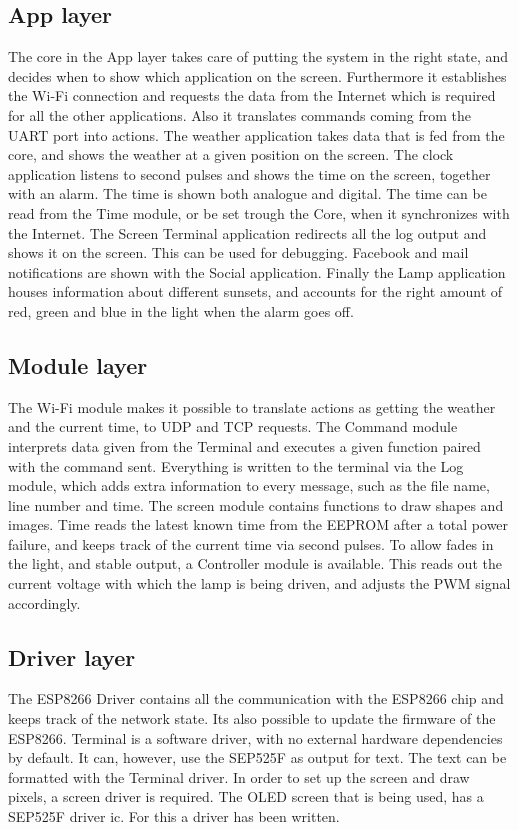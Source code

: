 \subsection{App layer} The core in the App layer takes care of putting the system in the right state, and decides when to show which application on the screen. Furthermore it establishes the Wi-Fi connection and requests the data from the Internet which is required for all the other applications. Also it translates commands coming from the UART port into actions. The weather application takes data that is fed from the core, and shows the weather at a given position on the screen. The clock application listens to second pulses and shows the time on the screen, together with an alarm. The time is shown both analogue and digital. The time can be read from the Time module, or be set trough the Core, when it synchronizes with the Internet. The Screen Terminal application redirects all the log output and shows it on the screen. This can be used for debugging. Facebook and mail notifications are shown with the Social application. Finally the Lamp application houses information about different sunsets, and accounts for the right amount of red, green and blue in the light when the alarm goes off.
\subsection{Module layer}
The Wi-Fi module makes it possible to translate actions as getting the weather and the current time, to UDP and TCP requests. The Command module interprets data given from the Terminal and executes a given function paired with the command sent. Everything is written to the terminal via the Log module, which adds extra information to every message, such as the file name, line number and time. The screen module contains functions to draw shapes and images. Time reads the latest known time from the EEPROM after a total power failure, and keeps track of the current time via second pulses. To allow fades in the light, and stable output, a Controller module is available. This reads out the current voltage with which the lamp is being driven, and adjusts the PWM signal accordingly. 
\subsection{Driver layer}
The ESP8266 Driver contains all the communication with the ESP8266 chip and keeps track of the network state. Its also possible to update the firmware of the ESP8266. Terminal is a software driver, with no external hardware dependencies by default. It can, however, use the SEP525F as output for text. The text can be formatted with the Terminal driver. In order to set up the screen and draw pixels, a screen driver is required. The OLED screen that is being used, has a SEP525F driver ic. For this a driver has been written.
